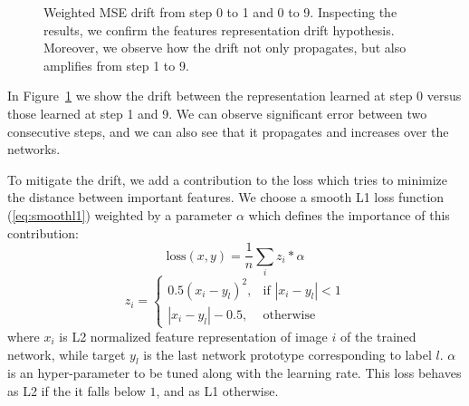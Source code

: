 \documentclass[10pt,twocolumn,letterpaper]{article}
\begin{document}
\begin{figure}
\begin{center}
\end{center}
\caption{Weighted MSE drift from step 0 to 1 and 0 to 9. Inspecting the results, we confirm the features representation drift hypothesis. Moreover, we observe how the drift not only propagates, but also amplifies from step 1 to 9.}
\label{5:histogram}
\end{figure}

In Figure~\ref{5:histogram} we show the drift between the representation learned at step 0 versus those learned at step 1 and 9. We can observe significant error between two consecutive steps, and we can also see that it propagates and increases over the networks.

To mitigate the drift, we add a contribution to the loss which tries to minimize the distance between important features. We choose a smooth L1 loss function (\ref{eq:smoothl1}) weighted by a parameter $\alpha$ which defines the importance of this contribution:
\begin{equation}
\text{loss}(x, y) = \frac{1}{n} \sum_{i} z_{i}*\alpha \label{eq:smoothl1}
\end{equation}
\[
    z_{i} =
    \begin{cases}
    0.5 (x_i - y_l)^2, & \text{if } |x_i - y_l| < 1 \\
    |x_i - y_l| - 0.5, & \text{otherwise }
    \end{cases}
\]
where $x_{i}$ is L2 normalized feature representation of image $i$ of the trained network, while target $y_{l}$ is the last network prototype corresponding to label $l$. $\alpha$ is an hyper-parameter to be tuned along with the learning rate.
This loss behaves as L2 if the it falls below $1$, and as L1 otherwise.
\end{document}
